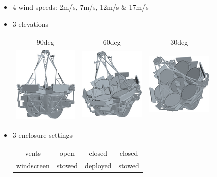 \documentclass[]{AO4ELT}  %
\begin{document}
\begin{itemize}
   \item 4 wind speeds: 2m/s, 7m/s, 12m/s \& 17m/s
   \item 3 elevations
         \begin{tabular}{ccc}
            90deg                                                             & 60deg & 30deg \\
            \includegraphics[width=0.2\linewidth]{zen00az000_OS7_tel_tr.png}  &
            \includegraphics[width=0.2\linewidth]{zen30az000_CD12_tel_tr.png} &
            \includegraphics[width=0.2\linewidth]{zen60az000_CS17_tel_tr.png}
         \end{tabular}
   \item 3 enclosure settings
         \begin{tabular}{cccc}
            vents                                                         & open                                                         &
            closed                                                        &
            closed                                                                                                                         \\
            windscreen                                                    & stowed                                                       &
            deployed                                                      &
            stowed                                                                                                                         \\

\end{tabular}
\end{itemize}
\end{document}
